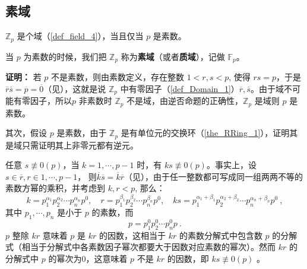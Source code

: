 

\subsection{素域}\label{sub_FmLT_1}

\begin{lemma}{}\label{lem_FmLT_1}
 $\mathbb Z_p$ 是个域（\autoref{def_field_4}），当且仅当 $p$ 是素数。
\end{lemma}

当 $p$ 为素数的时候，我们把 $\mathbb Z_p$ 称为\textbf{素域}（或者\textbf{质域}），记做 $\mathbb F_p$。

\textbf{证明：}
若 $p$ 不是素数，则由素数定义，存在整数 $1<r,s<p$, 使得 $rs=p$，于是 $\overline r\overline s=\overline p=\overline 0$（见），这就是说 $\mathbb Z_p$ 中有零因子（\autoref{def_Domain_1}）$\overline r,\overline s$。由于域不可能有零因子，所以$p$ 非素数时 $\mathbb Z_p$ 不是域，由逆否命题的正确性，$\mathbb Z_p$ 是域则 $p$ 是素数。

其次，假设 $p$ 是素数，由于 $\mathbb Z_p$ 是有单位元的交换环（\autoref{the_RRing_1}），证明其是域只需证明其上非零元都有逆元。

任意 $s\not\equiv 0(p)$，当 $k=1,\cdots,p-1$ 时，有 $ks\not\equiv 0(p)$。事实上，设 $s\in\overline r, r\in{1,\cdots,p-1}$， 则$\overline k\overline s=\overline k\overline r$（见），由于任一整数都可写成同一组两两不等的素数方幂的乘积，并考虑到 $k,r<p$, 那么：
\begin{equation}
k=p_1^{\alpha_1}p_2^{\alpha_2}\cdots p_n^{\alpha_n}p^0, \quad r=p_1^{\beta_1}p_2^{\beta_2}\cdots p_n^{\beta_n}p^0,\quad ks=p_1^{\alpha_1+\beta_1}p_2^{\alpha_2+\beta_2}\cdots p_n^{\alpha_n+\beta_n}p^0~,
\end{equation}
其中 $p_1,\cdots,p_n$ 是小于 $p$ 的素数，而
\begin{equation}
p=p_1^0p_2^0\cdots p_n^{0}p~.
\end{equation}
$p$ 整除 $kr$ 意味着 $p$ 是 $kr$ 的因数，这相当于 $kr$ 的素数分解式中包含数 $p$ 的分解式（相当于分解式中各素数因子幂次都要大于因数对应素数的幂次）。然而 $kr$ 的分解式中 $p$ 的幂次为0，这意味着 $p$ 不是 $kr$ 的因数，即 $ks\not\equiv 0(p)$ 。

